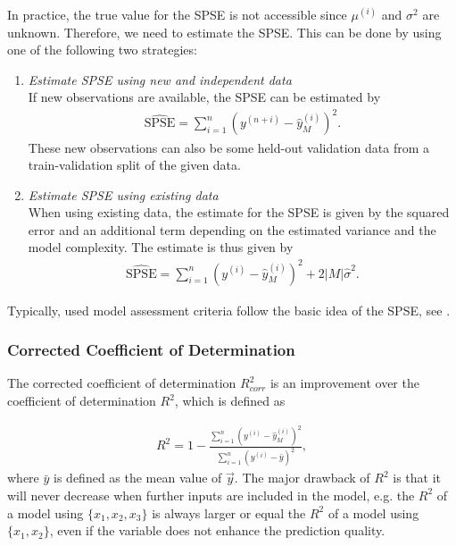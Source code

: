 \documentclass[10pt,a4paper]{report}
\begin{document}

In practice, the true value for the SPSE is not accessible since $\mu^{(i)}$ and $\sigma^2$ are unknown. Therefore, we need to estimate the SPSE. This can be done by using one of the following two strategies:

\begin{enumerate}

	\item \emph{Estimate SPSE using new and independent data} \\	
	If new observations are available, the SPSE can be estimated by
	\begin{align}
		\widehat{\text{SPSE}} = \sum_{i=1}^n (y^{(n+i)} - \hat y^{(i)}_M)^2.
	\end{align}
	These new observations can also be some held-out validation data from a train-validation split of the given data. 
	
	\item \emph{Estimate SPSE using existing data} \\
	When using existing data, the estimate for the SPSE is given by the squared error and an additional  term depending on the estimated variance and the model complexity. The estimate is thus given by
	\begin{align}
		\widehat{\text{SPSE}} = \sum_{i=1}^n(y^{(i)} - \hat y^{(i)}_M)^2 + 2\vert M \vert \hat \sigma^2.
	\end{align}

\end{enumerate}

Typically, used model assessment criteria follow the basic idea of the SPSE, see \cite{fahrmeir2007regression}.

\subsubsection{Corrected Coefficient of Determination}

The corrected coefficient of determination $R^2_{corr}$ is an improvement over the coefficient of determination $R^2$, which is defined as 

\begin{align}
	R^2 = 1 - \frac{\sum_{i=1}^n ( y^{(i)} - \hat y^{(i)}_M )^2}{\sum_{i=1}^n (y^{(i)} - \bar y)^2},
\end{align}
%
where $\bar y$ is defined as the mean value of $\vec{y}$. The major drawback of $R^2$ is that it will never decrease when further inputs are included in the model, e.g. the $R^2$ of a model using $\{x_1, x_2, x_3\}$ is always larger or equal the $R^2$ of a model using $\{x_1, x_2\}$, even if the variable does not enhance the prediction quality. 
\end{document}
